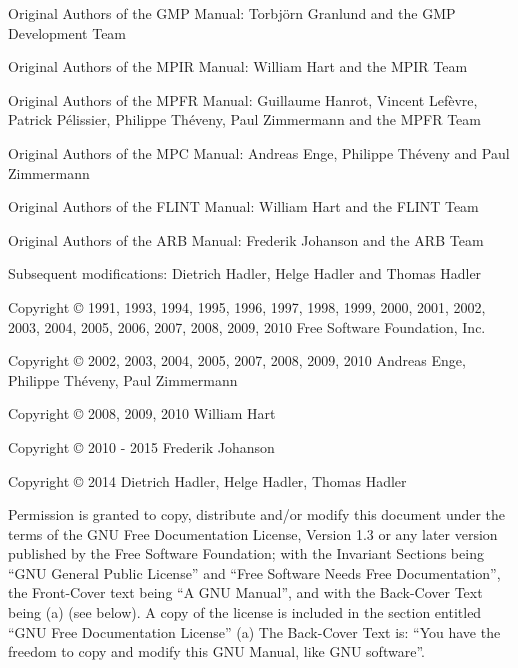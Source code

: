 \small
\noindent 
Original Authors of the GMP Manual: Torbj\"orn Granlund and the GMP Development Team

\noindent 
Original Authors of the MPIR Manual: William Hart and the MPIR Team

\noindent 
Original Authors of the MPFR Manual: Guillaume Hanrot, Vincent Lef\`evre, Patrick P\'elissier, Philippe Th\'eveny, Paul Zimmermann and the MPFR Team

\noindent 
Original Authors of the MPC Manual: Andreas Enge, Philippe Th\'eveny and Paul Zimmermann



\noindent 
Original Authors of the FLINT Manual: William Hart and the FLINT Team

\noindent 
Original Authors of the ARB Manual: Frederik Johanson and the ARB Team


\vspace{1cm}
\noindent 
Subsequent modifications: Dietrich Hadler, Helge Hadler and Thomas Hadler




 \vspace{11cm}


 
\noindent
Copyright \copyright \hspace{0.5mm} 1991, 1993, 1994, 1995, 1996, 1997, 1998, 1999, 2000, 2001, 2002, 2003, 2004, 2005, 2006, 2007, 2008, 2009, 2010 Free Software Foundation, Inc.

\noindent
Copyright \copyright \hspace{0.5mm}  2002, 2003, 2004, 2005, 2007, 2008, 2009, 2010 Andreas Enge, Philippe Th\'eveny, Paul Zimmermann

\noindent
Copyright \copyright \hspace{0.5mm}  2008, 2009, 2010 William Hart

\noindent
Copyright \copyright \hspace{0.5mm}  2010 - 2015 Frederik Johanson


\noindent
Copyright \copyright \hspace{0.5mm}  2014 Dietrich Hadler, Helge Hadler, Thomas Hadler

 \vspace{1cm}

\noindent
Permission is granted to copy, distribute and/or modify this document under the terms of the GNU Free Documentation License, Version 1.3 or any later version published by the Free Software Foundation; with the Invariant Sections being ``GNU General Public License'' and ``Free Software Needs Free Documentation'', the Front-Cover text being ``A GNU Manual'', and with the Back-Cover Text being (a) (see below). A copy of the license is included in the section entitled ``GNU Free Documentation License''
(a) The Back-Cover Text is: ``You have the freedom to copy and modify this GNU Manual, like GNU software''. 
\normalsize